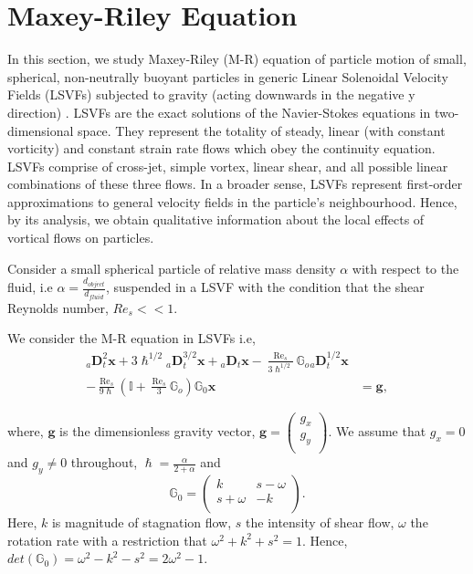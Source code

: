 \documentclass[pdflatex,sn-mathphys]{sn-jnl}%
\theoremstyle{thmstyleone}%
\theoremstyle{thmstyletwo}%
\theoremstyle{thmstylethree}%
\begin{document}
 


\section{Maxey-Riley Equation}\label{Maxey-Riley Equation}

In this section, we study Maxey-Riley (M-R) equation of particle motion of small,  spherical, non-neutrally buoyant particles in generic Linear Solenoidal Velocity Fields (LSVFs) subjected to gravity (acting downwards in the negative y direction) \cite{kobayashi2005stability}. LSVFs are the exact solutions of the Navier-Stokes equations in two-dimensional space. They represent the totality of steady, linear (with constant vorticity) and constant strain rate flows which obey the continuity equation. LSVFs comprise of cross-jet, simple vortex, linear shear, and all possible linear combinations of these three flows. In a broader sense, LSVFs represent first-order approximations to general velocity fields in the particle's neighbourhood. Hence, by its analysis, we obtain qualitative information about the local effects of vortical flows on particles.

Consider a small spherical particle of relative mass density $\alpha$ with respect to the fluid,   i.e $\alpha= \frac{d_{object}}{d_{fluid}}$,  suspended in a LSVF with the condition that the shear Reynolds number, $Re_{s} << 1$. 

	We consider the M-R equation in LSVFs \cite{kobayashi2005stability} i.e,
\begin{align}
{ }_a\mathbf{D}_{t}^{2} \mathbf{x}+3 \hslash^{1 / 2} { }_a\mathbf{D}_{t}^{3 / 2} \mathbf{x}+{ }_a\mathbf{D}_{t} \mathbf{x}-\frac{\operatorname{Re}_{s}}{3 \hslash^{1 / 2}} \mathbb{G}_{o} { }_a\mathbf{D}_{t}^{1 / 2} \mathbf{x}& \nonumber \\
-\frac{\operatorname{Re}_{s}}{9 \hslash}\left(\mathbb{I}+\frac{\operatorname{Re}_{s}}{3} \mathbb{G}_{o}\right) \mathbb{G}_{0} \mathbf{x}&=\mathbf{g}, \label{eq1 M-R RL}
\end{align}

where, $\mathbf{g}$ is the dimensionless gravity vector, $\mathbf{g}=\left(
\begin{array}{c}
 g_{x} \\
 g_{y} \\
\end{array}
\right)$.  We assume that $g_x=0$ and $g_y\neq0$ throughout,  $\hslash=\frac{\alpha}{2+\alpha}$ and $$
\mathbb{G}_{0}=\left(
\begin{array}{cc}
 k & s-\omega \\
 s+\omega & -k \\
\end{array}
\right).$$ Here, $k$ is magnitude of stagnation flow, $s$  the intensity of shear flow, $\omega$ the rotation rate with a restriction that $ \omega^2+k^2+s^2=1$. Hence, $det(\mathbb{G}_{0})=\omega^2-k^2-s^2= 2\omega^2-1$.
\end{document}
